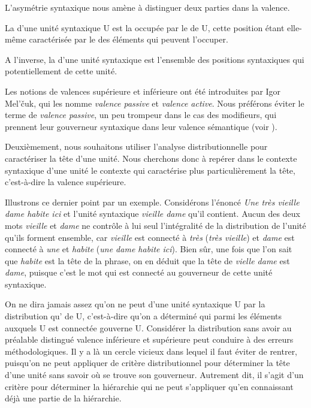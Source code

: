 L’asymétrie syntaxique nous amène à distinguer deux parties dans la valence.

{La  d’une unité syntaxique U est la  occupée par le  de U, cette position étant elle-même caractérisée par le  des éléments qui peuvent l’occuper.}

{A l’inverse, la  d’une unité syntaxique est l’ensemble des positions syntaxiques qui  potentiellement de cette unité.}

Les notions de valences supérieure et inférieure ont été introduites par Igor Mel’čuk, qui les nomme \textit{valence passive} et \textit{valence active}. Nous préférons éviter le terme de \textit{valence passive}, un peu trompeur dans le cas des modifieurs, qui prennent leur gouverneur syntaxique dans leur valence sémantique (voir ).

Deuxièmement, nous souhaitons utiliser l’analyse distributionnelle pour caractériser la tête d’une unité. Nous cherchons donc à repérer dans le contexte syntaxique d’une unité le contexte qui caractérise plus particulièrement la tête, c’est-à-dire la valence supérieure.

Illustrons ce dernier point par un exemple. Considérons l’énoncé \textit{Une très vieille dame habite ici} et l’unité syntaxique \textit{vieille dame} qu’il contient. Aucun des deux mots \textit{vieille} et \textit{dame} ne contrôle à lui seul l’intégralité de la distribution de l’unité qu’ils forment ensemble, car \textit{vieille} est connecté à \textit{très} (\textit{très vieille}) et \textit{dame} est connecté à \textit{une} et \textit{habite} (\textit{une dame habite ici}). Bien sûr, une fois que l’on sait que \textit{habite} est la tête de la phrase, on en déduit que la tête de \textit{vielle dame} est \textit{dame}, puisque c’est le mot qui est connecté au gouverneur de cette unité syntaxique.

On ne dira jamais assez qu’on ne peut  d’une unité syntaxique U par la distribution qu’  de U, c’est-à-dire qu’on a déterminé qui parmi les éléments auxquels U est connectée gouverne U. Considérer la distribution sans avoir au préalable distingué valence inférieure et supérieure peut conduire à des erreurs méthodologiques. Il y a là un cercle vicieux dans lequel il faut éviter de rentrer, puisqu’on ne peut appliquer de critère distributionnel pour déterminer la tête d’une unité sans savoir où se trouve son gouverneur. Autrement dit, il s’agit d’un critère pour déterminer la hiérarchie qui ne peut s’appliquer qu'en connaissant déjà une partie de la hiérarchie.

